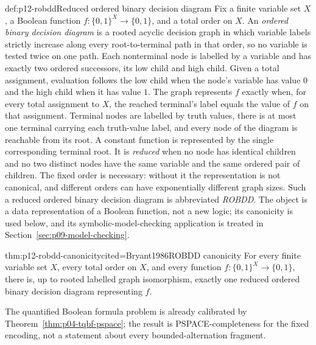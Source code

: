 \begin{hbdefinition}{def:p12-robdd}{Reduced ordered binary decision diagram}
Fix a finite variable set \(X\), a Boolean function
\(f:\{0,1\}^{X}\to\{0,1\}\), and a total order on \(X\).  An \emph{ordered
binary decision diagram} is a rooted acyclic decision graph in which variable
labels strictly increase along every root-to-terminal path in that order, so
no variable is tested twice on one path.  Each nonterminal node is labelled by
a variable and has exactly two ordered successors, its low child and high
child.  Given a total assignment, evaluation follows the low child when the
node's variable has value \(0\) and the high child when it has value \(1\).
The graph represents \(f\) exactly when, for every total assignment to \(X\),
the reached terminal's label equals the value of \(f\) on that assignment.
Terminal nodes are labelled by truth values, there is at most one
terminal carrying each truth-value label, and every node of the diagram is
reachable from its root.  A constant function is represented by the single
corresponding terminal root.
It is \emph{reduced} when no node has identical children
and no two distinct nodes have the same variable and the same ordered pair of
children.  The fixed order is necessary: without it the representation is not
canonical, and different orders can have exponentially different graph sizes.
Such a reduced ordered binary decision diagram is abbreviated \emph{ROBDD}.
The object is a data representation of a Boolean function, not a new logic;
its canonicity is used below, and its symbolic-model-checking application is
treated in Section~\ref{sec:p09-model-checking}.
\end{hbdefinition}

\begin{hbtheorem}{thm:p12-robdd-canonicity}{cited=Bryant1986}{ROBDD canonicity}
For every finite variable set \(X\), every total order on \(X\), and every
function \(f:\{0,1\}^{X}\to\{0,1\}\), there is, up to rooted labelled graph
isomorphism, exactly one reduced ordered binary decision diagram representing
\(f\).
\end{hbtheorem}

The quantified Boolean formula problem is already calibrated by
Theorem~\ref{thm:p04-tqbf-pspace}; the result is PSPACE-completeness for the
fixed encoding, not a statement about every bounded-alternation fragment.

